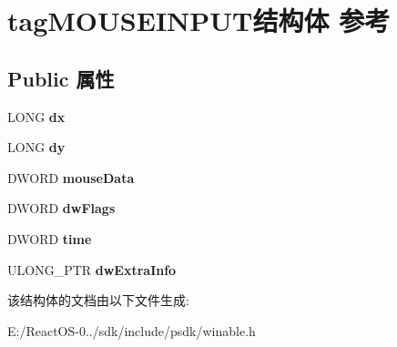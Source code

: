 \hypertarget{structtag_m_o_u_s_e_i_n_p_u_t}{}\section{tag\+M\+O\+U\+S\+E\+I\+N\+P\+U\+T结构体 参考}
\label{structtag_m_o_u_s_e_i_n_p_u_t}
\subsection*{Public 属性}
\begin{DoxyCompactItemize}
\item 
\mbox{\label{structtag_m_o_u_s_e_i_n_p_u_t_a8fd257dfae826069e0ec8f5299899c3d}} 
L\+O\+NG {\bfseries dx}
\item 
\mbox{\label{structtag_m_o_u_s_e_i_n_p_u_t_a96997b172a28eca34d68cbb86e57f64c}} 
L\+O\+NG {\bfseries dy}
\item 
\mbox{\label{structtag_m_o_u_s_e_i_n_p_u_t_a9a6ebc286c14fd27d839dfd38ffe5532}} 
D\+W\+O\+RD {\bfseries mouse\+Data}
\item 
\mbox{\label{structtag_m_o_u_s_e_i_n_p_u_t_ad44633e53cc5984eae18fd23ee99e364}} 
D\+W\+O\+RD {\bfseries dw\+Flags}
\item 
\mbox{\label{structtag_m_o_u_s_e_i_n_p_u_t_a4cebee2bb9bad7a62b7a3a9906dc680d}} 
D\+W\+O\+RD {\bfseries time}
\item 
\mbox{\label{structtag_m_o_u_s_e_i_n_p_u_t_a57eb1cf6938451efe5dae4b49529fd0d}} 
U\+L\+O\+N\+G\+\_\+\+P\+TR {\bfseries dw\+Extra\+Info}
\end{DoxyCompactItemize}


该结构体的文档由以下文件生成\+:\begin{DoxyCompactItemize}
\item 
E\+:/\+React\+O\+S-\/0../sdk/include/psdk/winable.\+h\end{DoxyCompactItemize}
